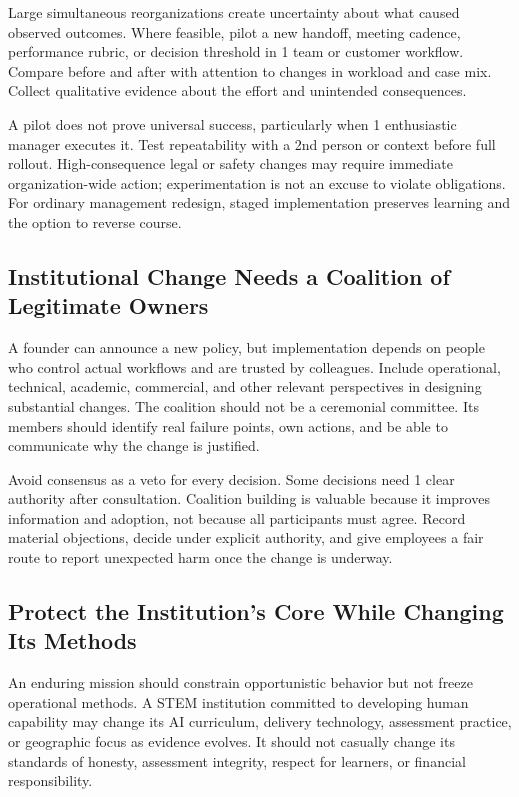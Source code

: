 Large simultaneous reorganizations create uncertainty about what caused observed outcomes. Where feasible, pilot a new handoff, meeting cadence, performance rubric, or decision threshold in 1 team or customer workflow. Compare before and after with attention to changes in workload and case mix. Collect qualitative evidence about the effort and unintended consequences.

A pilot does not prove universal success, particularly when 1 enthusiastic manager executes it. Test repeatability with a 2nd person or context before full rollout. High-consequence legal or safety changes may require immediate organization-wide action; experimentation is not an excuse to violate obligations. For ordinary management redesign, staged implementation preserves learning and the option to reverse course.

\subsection{Institutional Change Needs a Coalition of Legitimate Owners}
\label{sec:coalition_legitimate_owners}

A founder can announce a new policy, but implementation depends on people who control actual workflows and are trusted by colleagues. Include operational, technical, academic, commercial, and other relevant perspectives in designing substantial changes. The coalition should not be a ceremonial committee. Its members should identify real failure points, own actions, and be able to communicate why the change is justified.

Avoid consensus as a veto for every decision. Some decisions need 1 clear authority after consultation. Coalition building is valuable because it improves information and adoption, not because all participants must agree. Record material objections, decide under explicit authority, and give employees a fair route to report unexpected harm once the change is underway.

\subsection{Protect the Institution's Core While Changing Its Methods}
\label{sec:protect_core_change_methods}

An enduring mission should constrain opportunistic behavior but not freeze operational methods. A STEM institution committed to developing human capability may change its AI curriculum, delivery technology, assessment practice, or geographic focus as evidence evolves. It should not casually change its standards of honesty, assessment integrity, respect for learners, or financial responsibility.

